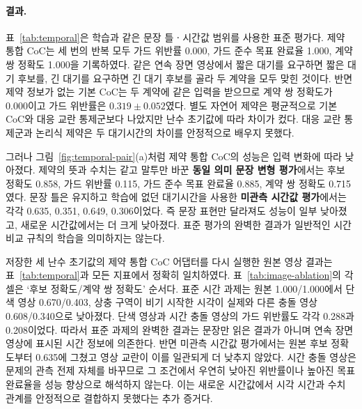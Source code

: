 \paragraph{결과.}
표~\ref{tab:temporal}은 학습과 같은 문장 틀ㆍ시간값 범위를 사용한 표준 평가다. 제약 통합 CoC는 세 번의 반복 모두 가드 위반률 0.000, 가드 준수 목표 완료율 1.000, 계약 쌍 정확도 1.000을 기록하였다. 같은 연속 장면 영상에서 짧은 대기를 요구하면 짧은 대기 후보를, 긴 대기를 요구하면 긴 대기 후보를 골라 두 계약을 모두 맞힌 것이다. 반면 제약 정보가 없는 기본 CoC는 두 계약에 같은 입력을 받으므로 계약 쌍 정확도가 0.000이고 가드 위반률은 $0.319\pm0.052$였다. 별도 자연어 제약은 평균적으로 기본 CoC와 대응 교란 통제군보다 나았지만 난수 초기값에 따라 차이가 컸다. 대응 교란 통제군과 논리식 제약은 두 대기시간의 차이를 안정적으로 배우지 못했다.


그러나 그림~\ref{fig:temporal-pair}(a)처럼 제약 통합 CoC의 성능은 입력 변화에 따라 낮아졌다. 제약의 뜻과 수치는 같고 말투만 바꾼 \textbf{동일 의미 문장 변형 평가}에서는 후보 정확도 0.858, 가드 위반률 0.115, 가드 준수 목표 완료율 0.885, 계약 쌍 정확도 0.715였다. 문장 틀은 유지하고 학습에 없던 대기시간을 사용한 \textbf{미관측 시간값 평가}에서는 각각 0.635, 0.351, 0.649, 0.306이었다. 즉 문장 표현만 달라져도 성능이 일부 낮아졌고, 새로운 시간값에서는 더 크게 낮아졌다. 표준 평가의 완벽한 결과가 일반적인 시간 비교 규칙의 학습을 의미하지는 않는다.

저장한 세 난수 초기값의 제약 통합 CoC 어댑터를 다시 실행한 원본 영상 결과는 표~\ref{tab:temporal}과 모든 지표에서 정확히 일치하였다. 표~\ref{tab:image-ablation}의 각 셀은 `후보 정확도/계약 쌍 정확도' 순서다. 표준 시간 과제는 원본 1.000/1.000에서 단색 영상 0.670/0.403, 상충 구역이 비기 시작한 시각이 실제와 다른 충돌 영상 0.608/0.340으로 낮아졌다. 단색 영상과 시간 충돌 영상의 가드 위반률도 각각 0.288과 0.208이었다. 따라서 표준 과제의 완벽한 결과는 문장만 읽은 결과가 아니며 연속 장면 영상에 표시된 시간 정보에 의존한다. 반면 미관측 시간값 평가에서는 원본 후보 정확도부터 0.635에 그쳤고 영상 교란이 이를 일관되게 더 낮추지 않았다. 시간 충돌 영상은 문제의 관측 전제 자체를 바꾸므로 그 조건에서 우연히 낮아진 위반률이나 높아진 목표 완료율을 성능 향상으로 해석하지 않는다. 이는 새로운 시간값에서 시각 시간과 수치 관계를 안정적으로 결합하지 못했다는 추가 증거다.

